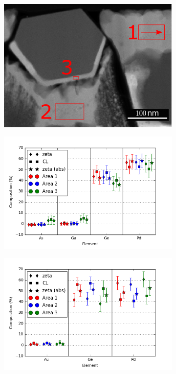 \begin{figure}[h!]
	\centering
	\begin{subfigure}{.7\textwidth}
		\includegraphics[width=\textwidth]{fig/q/B-C-F/BCF}
		\caption{}
		\label{fig:BCF-overview}
	\end{subfigure}
	\hfill
	\begin{subfigure}{0.7\textwidth}
		\includegraphics[width=\textwidth]{fig/q/B-C-F/AsGaGePd-GeKline-std}
		\caption{}
		\label{fig:BCF1}
	\end{subfigure}
	\hfill
	\begin{subfigure}{0.7\textwidth}
		\includegraphics[width=\textwidth]{fig/q/B-C-F/AuGePd-std}

\end{subfigure}
\end{figure}
